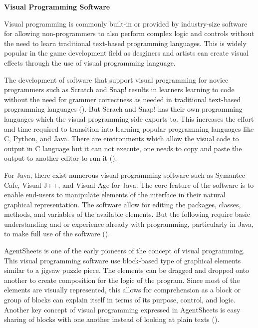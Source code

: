 \flushleft
\textbf{Visual Programming Software}\\
\justifying

\parx
Visual programming is commonly built-in or provided by industry-size software for
allowing non-programmers to also perform complex logic and controls without the need to
learn traditional text-based programming languages. This is widely popular in the game
development field as desginers and artists can create visual effects through the use of
visual programming language.

The development of software that support visual programming for novice programmers such
as Scratch and Snap! results in learners learning to code without the need for grammer
correctness as needed in traditional text-based programming languages
(\cite{bau_gray_kelleher_sheldon_turbak_2017}). But Scrach and Snap! has their own
programming languages which the visual programming side exports to.  This increases the
effort and time required to transition into learning popular programming languages like
C, Python, and Java. There are environments which allow the visual code to output in
C language but it can not execute, one needs to copy and paste the output to another
editor to run it (\cite{abe_fukawa_tanaka_2019}).

For Java, there exist numerous visual programming software such as Symantec Cafe,
Visual J++, and Visual Age for Java. The core feature of the software is to enable
end-users to manipulate elements of the interface in their natural graphical
representation. The software allow for editing the packages, classes, methods, and
variables of the available elements. But the following require basic understanding and
or experience already with programming, particularly in Java, to make full use of the
software (\cite{prokhorov_kosarev}).

AgentSheets is one of the early pioneers of the concept of visual programming. This
visual programming software use block-based type of graphical elements similar to
a jigsaw puzzle piece. The elements can be dragged and dropped onto another to create
composition for the logic of the program. Since most of the elements are visually
represented, this allows for comprehension as a block or group of blocks can explain
itself in terms of its purpose, control, and logic. Another key concept of visual
programming expressed in AgentSheets is easy sharing of blocks with one another
instead of looking at plain texts (\cite{repenning_2017}).
